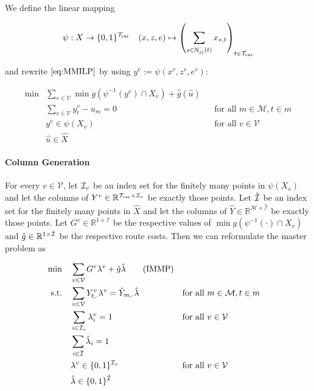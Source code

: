 We define the linear mapping

\begin{align*}
	\psi:X\to\{0,1\}^{\mathcal{T}_{\operatorname{car}}} && (x,z,e)\mapsto\left(\sum_{s\in\operatorname{N}_G^-(t)}x_{s,t}\right)_{t\in\mathcal{T}_{\operatorname{car}}}
\end{align*}

and rewrite $\eqref{eq:MMILP}$ by using $y^v:=\psi\left(x^v,z^v,e^v\right)$:

\begin{align*}
	\min & \sum_{v\in\mathcal{V}}\min g\left(\psi^{-1}\left(y^v\right)\cap X_v\right) + \hat{g}\left(\hat{u}\right) \\
	& \sum_{v\in\mathcal{V}}y^v_t - u_m = 0 && \text{for all } m\in\mathcal{M},t\in m \\
	& y^v\in \psi\left(X_v\right) && \text{for all } v\in\mathcal{V} \\
	& \hat{u}\in\hat{X}
\end{align*}

\paragraph{Column Generation} \parfill

For every $v\in\mathcal{V}$, let $\mathcal{I}_v$ be an index set for the finitely many points in $\psi\left(X_v\right)$ and let the columns of $Y^v\in\mathbb{R}^{\mathcal{T}_{\operatorname{car}}\times\mathcal{I}_v}$ be exactly those points. Let $\hat{\mathcal{I}}$ be an index set for the finitely many points in $\hat{X}$ and let the columns of $\hat{Y}\in\mathbb{R}^{\mathcal{M}\times\hat{\mathcal{I}}}$ be exactly those points. Let $G^v\in\mathbb{R}^{1\times\mathcal{I}}$ be the respective values of $\min g\left(\psi^{-1}(\cdot)\cap X_v\right)$ and $\hat{g}\in\mathbb{R}^{1\times\hat{\mathcal{I}}}$ be the respective route costs. Then we can reformulate the master problem as

\begin{align*}
	\min \quad & \sum_{v\in\mathcal{V}}G^v\lambda^v + \hat{g}\hat{\lambda} \tag{IMMP} \\
	\text{s.t.} \quad & \sum_{v\in\mathcal{V}} Y^v_{t,\cdot}\lambda^v = \hat{Y}_{m,\cdot}\hat{\lambda} && \text{for all } m\in\mathcal{M},t\in m \\
	& \sum_{i\in\mathcal{I}_v}\lambda_i^v=1 && \text{for all } v\in\mathcal{V}\\
	& \sum_{i\in\hat{\mathcal{I}}}\hat{\lambda}_i= 1 \\
	& \lambda^v\in\{0,1\}^{\mathcal{I}_v} && \text{for all } v\in\mathcal{V} \\
	& \hat{\lambda}\in\{0,1\}^{\hat{\mathcal{I}}}
\end{align*}

